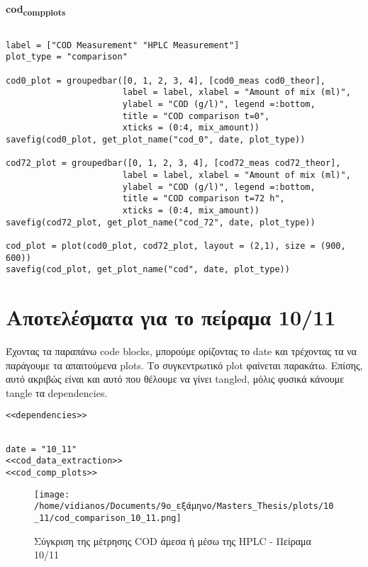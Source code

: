 \documentclass[11pt]{article}
\begin{document}
\textbf{cod\textsubscript{comp}\textsubscript{plots}}
\begin{verbatim}

label = ["COD Measurement" "HPLC Measurement"]
plot_type = "comparison"

cod0_plot = groupedbar([0, 1, 2, 3, 4], [cod0_meas cod0_theor],
                       label = label, xlabel = "Amount of mix (ml)",
                       ylabel = "COD (g/l)", legend =:bottom,
                       title = "COD comparison t=0",
                       xticks = (0:4, mix_amount))
savefig(cod0_plot, get_plot_name("cod_0", date, plot_type))

cod72_plot = groupedbar([0, 1, 2, 3, 4], [cod72_meas cod72_theor],
                       label = label, xlabel = "Amount of mix (ml)",
                       ylabel = "COD (g/l)", legend =:bottom,
                       title = "COD comparison t=72 h",
                       xticks = (0:4, mix_amount))
savefig(cod72_plot, get_plot_name("cod_72", date, plot_type))

cod_plot = plot(cod0_plot, cod72_plot, layout = (2,1), size = (900, 600))
savefig(cod_plot, get_plot_name("cod", date, plot_type))

\end{verbatim}

\section{Αποτελέσματα για το πείραμα 10/11}
\label{sec:org5d405a5}
Έχοντας τα παραπάνω code blocks, μπορούμε ορίζοντας το date και τρέχοντας τα να παράγουμε τα απαιτούμενα plots. Το συγκεντρωτικό plot φαίνεται παρακάτω. Επίσης, αυτό ακριβώς είναι και αυτό που θέλουμε να γίνει tangled, μόλις φυσικά κάνουμε tangle τα dependencies.

\begin{verbatim}
<<dependencies>>
\end{verbatim}

\begin{verbatim}

date = "10_11"
<<cod_data_extraction>>
<<cod_comp_plots>>

\end{verbatim}

\begin{figure}[htbp]
\centering
\texttt{[image: /home/vidianos/Documents/9o\_εξάμηνο/Masters\_Thesis/plots/10\_11/cod\_comparison\_10\_11.png]}
\caption{Σύγκριση της μέτρησης COD άμεσα ή μέσω της HPLC - Πείραμα 10/11}
\end{figure}
\end{document}
